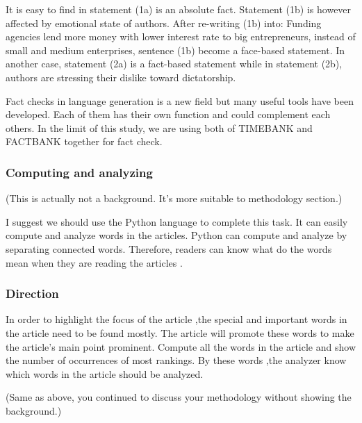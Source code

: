 It is easy to find in statement (1a) is an absolute fact. Statement (1b) is however affected by emotional state of authors. After re-writing (1b) into: Funding agencies lend more money with lower interest rate to big entrepreneurs, instead of small and medium enterprises, sentence (1b) become a face-based statement. In another case, statement (2a) is a fact-based statement while in statement (2b), authors are stressing their dislike toward dictatorship.

Fact checks in language generation is a new field but many useful tools have been developed. Each of them has their own function and could complement each others. In the limit of this study, we are using both of TIMEBANK and FACTBANK together for fact check.

\subsubsection*{Computing and analyzing}
(This is actually not a background. It's more suitable to methodology section.)

I suggest we should use the Python language to complete this task. It can easily compute and analyze words in the articles. Python can compute and analyze by separating connected words. Therefore, readers can know what do the words mean when they are reading the articles .

\subsubsection*{Direction}
In order to highlight the focus of the article ,the special and important words in the article need to be found mostly. The article will promote these words to make the article's main point prominent. Compute all the words in the article and show the number of occurrences of most rankings. By these words ,the analyzer know which words in the article should be analyzed.


(Same as above, you continued to discuss your methodology without showing the background.)
